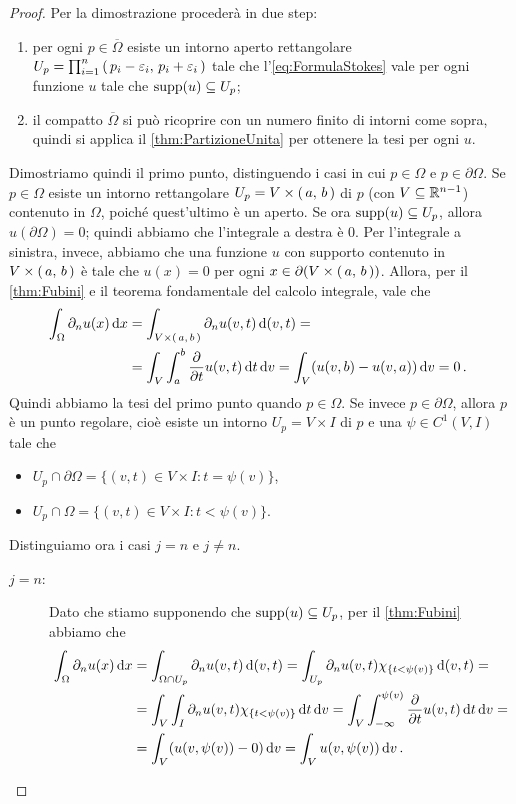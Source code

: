 \begin{proof}
	Per la dimostrazione procederà in due step:
	\begin{enumerate}
		\item per ogni $p\in \overline\Omega$ esiste un intorno aperto rettangolare $U_p=\prod_{i=1}^n \left(\,p_i-\varepsilon_i,\,p_i+\varepsilon_i\,\right)$
			tale che l'\cref{eq:FormulaStokes} vale per ogni funzione $u$ tale che $\operatorname{supp}(u)\subseteq U_p$;
		\item il compatto $\overline\Omega$ si può ricoprire con un numero finito di intorni come sopra, quindi si applica il \cref{thm:PartizioneUnita} per ottenere
			la tesi per ogni $u$.
	\end{enumerate}
	
	Dimostriamo quindi il primo punto, distinguendo i casi in cui $p\in \Omega$ e $p\in \partial \Omega$.
	Se $p\in \Omega$ esiste un intorno rettangolare $U_p=V\times \left(\,a,\,b\,\right)$ di $p$ (con $V\subseteq \mathbb R^{n-1}$) contenuto in $\Omega$, poiché quest'ultimo è un aperto. Se ora $\operatorname{supp}(u)\subseteq U_p$,
	allora $u(\partial \Omega)=0$; quindi abbiamo che l'integrale a destra è $0$. Per l'integrale a sinistra, invece, abbiamo che una funzione $u$
	con supporto contenuto in $V\times \left(\,a,\,b\,\right)$ è tale che $u(x)=0$ per ogni
	$x\in \partial (V\times \left(\,a,\,b\,\right))$. Allora, per il \cref{thm:Fubini} e il teorema fondamentale del calcolo integrale, vale che
	\begin{align*}
		\int_{\Omega} \partial_n u(x) \,\mathrm d x &= \int_{V\times \left(\,a,\,b\,\right)} \partial_n u(v,t) \,\mathrm d (v,t) = \\
		& = \int_V \int_a^b \frac{\partial}{\partial t} u(v,t) \,\mathrm d t \,\mathrm d v = \int_V (u(v,b) - u(v,a)) \,\mathrm d v = 0\, \text{. }
	\end{align*}
	Quindi abbiamo la tesi del primo punto quando $p\in\Omega$. Se invece $p\in \partial \Omega$, allora $p$ è un punto regolare, cioè esiste
	un intorno $U_p=V\times I$ di $p$ e una $\psi\in C^1(V,I)$ tale che
	\begin{itemize}
		\item $U_p\cap \partial \Omega = \{(v,t)\in V\times I:t=\psi(v)\}$,
		\item $U_p\cap \Omega = \{(v,t)\in V\times I:t<\psi(v)\}$.
	\end{itemize}
	Distinguiamo ora i casi $j=n$ e $j\neq n$.
	\begin{description}
		\item [$j=n$:] Dato che stiamo supponendo che $\operatorname{supp}(u)\subseteq U_p$, per il \cref{thm:Fubini} abbiamo che
			\begin{align*}
				\int_{\Omega} \partial_n u(x) \,\mathrm d x  &= \int_{\Omega\cap U_p} \partial_n u(v,t)\,\mathrm d (v,t) =
				\int_{U_p} \partial_n u(v,t) \chi_{\{t<\psi(v)\}} \,\mathrm d (v,t) = \\
				& = \int_V \int_I \partial_n u(v,t) \chi_{\{t<\psi(v)\}} \,\mathrm d t \,\mathrm d v =
				\int_V \int_{-\infty}^{\psi(v)} \frac{\partial}{\partial t} u(v,t) \,\mathrm d t \,\mathrm d v = \\
				& = \int_V (u(v,\psi(v)) - 0) \,\mathrm d v = \int_V u(v,\psi(v)) \,\mathrm d v\, \text{. }
			\end{align*}
			

\end{description}
\end{proof}
